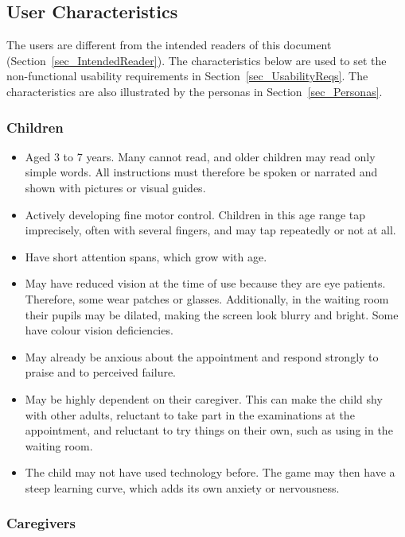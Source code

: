 \documentclass[10pt]{article}
\begin{document}
\subsection{User Characteristics} \label{SecUserCharacteristics}

The users are different from the intended readers of this document (Section~\ref{sec_IntendedReader}). 
The characteristics below are used to set the non-functional usability requirements in 
Section~\ref{sec_UsabilityReqs}. The characteristics are also illustrated by the personas in 
Section~\ref{sec_Personas}.

\subsubsection*{\textbf{Children}}

\begin{itemize}
    \item Aged 3 to 7 years. Many cannot read, and older children may read only simple words. All instructions must therefore be spoken or narrated and shown with pictures
    or visual guides.
    \item Actively developing fine motor control. Children in this age range tap imprecisely, often 
    with several fingers, and may tap repeatedly or not at all.
    \item Have short attention spans, which grow with age.
    \item May have reduced vision at the time of use because they are eye patients. Therefore, some 
    wear patches or glasses. Additionally, in the waiting room their pupils may be dilated, 
    making the screen look blurry and bright. Some have colour vision deficiencies.
    \item May already be anxious about the appointment and respond strongly to praise and 
    to perceived failure.
    \item May be highly dependent on their caregiver. This can make the child shy with other
    adults, reluctant to take part in the examinations at the appointment, and reluctant to try
    things on their own, such as using \progname{} in the waiting room.
    \item The child may not have used technology before. The game may then have a steep
    learning curve, which adds its own anxiety or nervousness.
\end{itemize}

\subsubsection*{\textbf{Caregivers}}
\end{document}

